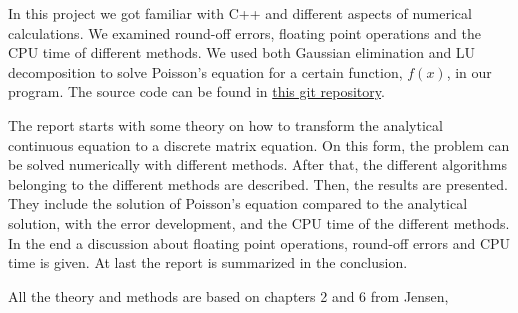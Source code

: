 In this project we got familiar with C++ and different aspects of numerical calculations. We examined round-off errors, floating point operations and the CPU time of different methods. We used both Gaussian elimination and LU decomposition to solve Poisson's equation for a certain function, $f(x)$, in our program. The source code can be found in \href{https://github.com/kjetka/Prosjekt1_1}{this git repository}. 



	
The report starts with some theory on how to transform the analytical continuous equation to a discrete matrix equation. On this form, the problem can be solved numerically with different methods. After that, the different algorithms belonging to the different methods are described. Then, the results are presented. They include the solution of Poisson's equation compared to the analytical solution, with the error development, and the CPU time of the different methods. In the end a discussion about floating point operations, round-off errors and CPU time is given. At last the report is summarized in the conclusion.

All the theory and methods are based on chapters 2 and 6 from Jensen, \cite{Jensen}
